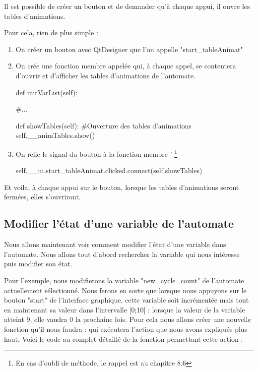 Il est possible de créer un bouton et de demander qu'à chaque appui, il ouvre les tables d'animations.

Pour cela, rien de plus simple :

\begin{enumerate}
    \item On créer un bouton avec QtDesigner que l'on appelle "start\_tableAnimat"
    \item On crée une fonction membre appelée  qui, à chaque appel, se contentera d'ouvrir et d'afficher les tables d'animations de l'automate.
    
    \begin{pyCode}
        def initVarList(self):
        
            #...
        
        def showTables(self):
            #Ouverture des tables d'animations
            self.__animTables.show()
    \end{pyCode}
    \item On relie le signal du bouton à la fonction membre  ' \footnote{En cas d'oubli de méthode, le rappel est au chapitre 8.6}
    
    \begin{pyCode}
        self.__ui.start_tableAnimat.clicked.connect(self.showTables)
    \end{pyCode}
   
\end{enumerate}

Et voila, à chaque appui sur le bouton, lorsque les tables d'animations seront fermées, elles s'ouvriront.

\subsection{Modifier l'état d'une variable de l'automate}

Nous allons maintenant voir comment modifier l'état d'une variable dans l'automate.\newline
Nous allons tout d'abord rechercher la variable qui nous intéresse puis modifier son état.\smallSkip

Pour l'exemple, nous modifierons la variable "new\_cycle\_count" de l'automate actuellement sélectionné.\newline
Nous ferons en sorte que lorsque nous appuyons sur le bouton "start" de l'interface graphique, cette variable soit incrémentée mais tout en maintenant sa valeur dans l'intervalle [0;10[ : lorsque la valeur de la variable atteint 9, elle vaudra 0 la prochaine fois.\newline
Pour cela nous allons créer une nouvelle fonction qu'il nous faudra  :  qui exécutera l'action que nous avons expliqués plus haut.\smallSkip
Voici le code au complet détaillé de la fonction permettant cette action :

